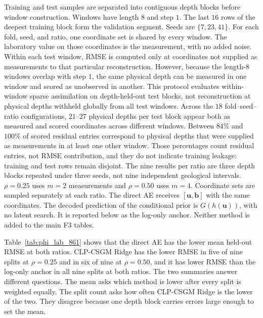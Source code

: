 Training and test samples are separated into contiguous depth blocks before
window construction. Windows have length $8$ and step $1$. The last $16$ rows
of the deepest training block form the validation segment. Seeds are
$\{7,23,41\}$. For each fold, seed, and ratio, one coordinate set is shared by
every window. The laboratory value on those coordinates is the measurement,
with no added noise. Within each test window, RMSE is computed only at
coordinates not supplied as measurements to that particular reconstruction.
However, because the length-$8$ windows overlap with step $1$, the same
physical depth can be measured in one window and scored as unobserved in
another. This protocol evaluates within-window sparse assimilation on
depth-held-out test blocks, not reconstruction at physical depths withheld
globally from all test windows. Across the $18$ fold--seed--ratio
configurations, $21$--$27$ physical depths per test block appear both as
measured and scored coordinates across different windows. Between $84\%$ and
$100\%$ of scored residual entries correspond to physical depths that were
supplied as measurements in at least one other window. Those percentages count
residual entries, not RMSE contribution, and they do not indicate training
leakage: training and test rows remain disjoint. The nine results per ratio
are three depth blocks repeated under three seeds, not nine independent
geological intervals. $\rho=0.25$ uses $m=2$ measurements and $\rho=0.50$ uses
$m=4$. Coordinate sets are sampled separately at each ratio. The direct AE
receives $[\boldsymbol{u},\boldsymbol{b}]$ with the same coordinates.
The decoded prediction of the conditional prior is
$G(h(\boldsymbol{u}))$, with no latent search. It is reported below as the
log-only anchor. Neither
method is added to the main F3 tables.

\begin{table}[htbp]
  \centering
  \caption{Well 861 laboratory-porosity supplement. Entries are the mean
  within-window held-out RMSE across three depth blocks and three seeds
  ($n=9$ block--seed pairs, not nine independent intervals). $\Delta$ is
  AE minus CLP-CSGM Ridge; a negative value means the direct AE has the lower
  mean. CLP$>$AE counts splits in which CLP-CSGM Ridge has the lower RMSE.}
  \label{tab:phi_lab_861}
  \small
\end{table}

Table~\ref{tab:phi_lab_861} shows that the direct AE has the lower mean
held-out RMSE at both ratios. CLP-CSGM Ridge has the lower RMSE in five of
nine splits at $\rho=0.25$ and in six of nine at $\rho=0.50$, and it has lower
RMSE than the log-only anchor in all nine splits at both ratios. The two
summaries answer different questions. The mean asks which method is lower
after every split is weighted equally. The split count asks how often
CLP-CSGM Ridge is the lower of the two. They disagree because one depth block
carries errors large enough to set the mean.

